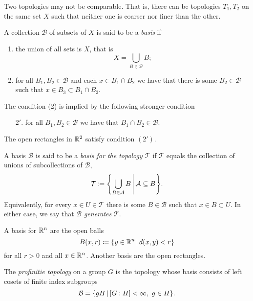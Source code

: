 \documentclass[12pt]{book} %
\newcommand{\T}{\mathcal T}
\newcommand{\B}{\mathcal B}
\begin{document}
\begin{note}
Two topologies may not be comparable.
That is, there can be topologies \( T_1, T_2 \) on the same set \( X \) such that neither one is coarser nor finer than the other.
\end{note}

\begin{definition}
A collection \( \B \) of subsets of \( X \) is said to be a \emph{basis} if
\begin{enumerate}
\item the union of all sets is \( X \), that is \[ X = \bigcup_{B \in \B} B; \]
\item for all \( B_1, B_2 \in \B \) and each \( x \in B_1 \cap B_2 \) we have that there is some \( B_2 \in \B \) such that \( x \in B_3 \subset B_1 \cap B_2 \).
\end{enumerate}
\end{definition}

\begin{note}
The condition (2) is implied by the following stronger condition
\begin{enumerate}
\item[\( 2'. \)] for all \( B_1, B_2 \in \B \) we have that \( B_1 \cap B_2 \in \B \).
\end{enumerate}
\end{note}

\begin{example}
The open rectangles in \( \mathbb{R}^2 \) satisfy condition \( (2') \).
\end{example}

\begin{definition}
A basis \( \B \) is said to be a \emph{basis for the topology \( \T \)} if \( \T \) equals the collection of unions of subcollections of \( \mathcal B \), \ie 
\[ \T \coloneqq \set*{ \bigcup_{B \in \mathcal A} B \given* \mathcal A \subset B}. \]
Equivalently, for every \( x \in U \in \T \) there is some \( B \in \B \) such that \( x \in B \subset U \).
In either case, we say that \( \B \) \emph{generates} \( \T \).
\end{definition}

\begin{example}
A basis for \( \mathbb{R}^n \) are the open balls
\[ B(x, r) \coloneqq \set{y \in \R^n \given d(x, y) < r } \]
for all \( r > 0 \) and all \( x \in \mathbb{R}^n \).
Another basis are the open rectangles.
\end{example}

\begin{definition}
The \emph{profinitie topology} on a group \( G \) is the topology whose basis consists of left cosets of finite index subgroups
\[ \B = \set{gH \given [G : H] < \infty,\ g \in H}. \]
\end{definition}
\end{document}
